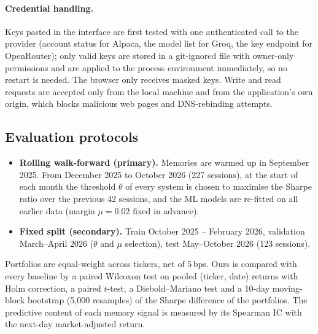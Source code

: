\paragraph{Credential handling.} Keys pasted in the interface are first tested with one authenticated call to the provider (account status for Alpaca, the model list for Groq, the key endpoint for OpenRouter); only valid keys are stored in a git-ignored file with owner-only permissions and are applied to the process environment immediately, so no restart is needed. The browser only receives masked keys. Write and read requests are accepted only from the local machine and from the application's own origin, which blocks malicious web pages and DNS-rebinding attempts.

\subsection{Evaluation protocols}
\label{sec:protocols}
\begin{itemize}
  \item \textbf{Rolling walk-forward (primary).} Memories are warmed up in September 2025. From December 2025 to October 2026 (227 sessions), at the start of each month the threshold $\theta$ of every system is chosen to maximise the Sharpe ratio over the previous 42 sessions, and the ML models are re-fitted on all earlier data (margin $\mu=0.02$ fixed in advance).
  \item \textbf{Fixed split (secondary).} Train October 2025 -- February 2026, validation March--April 2026 ($\theta$ and $\mu$ selection), test May--October 2026 (123 sessions).
\end{itemize}
Portfolios are equal-weight across tickers, net of 5\,bps. Ours is compared with every baseline by a paired Wilcoxon test on pooled (ticker, date) returns with Holm correction, a paired $t$-test, a Diebold--Mariano test and a 10-day moving-block bootstrap (5{,}000 resamples) of the Sharpe difference of the portfolios. The predictive content of each memory signal is measured by its Spearman IC with the next-day market-adjusted return.

